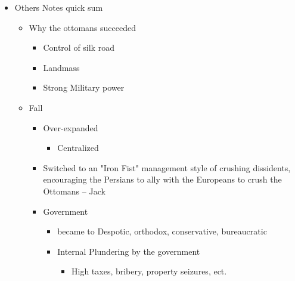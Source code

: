 \documentclass[letterpaper]{article}
\begin{document}
\begin{itemize}
\item Others Notes quick sum

\begin{itemize}
\item Why the ottomans succeeded

\begin{itemize}
\item Control of silk road
\item Landmass
\item Strong Military power
\end{itemize}

\item Fall

\begin{itemize}
\item Over-expanded

\begin{itemize}
\item Centralized
\end{itemize}

\item Switched to an "Iron Fist" management style of crushing
dissidents, encouraging the Persians to ally with the Europeans to
crush the Ottomans -- Jack
\item Government

\begin{itemize}
\item became to Despotic, orthodox, conservative, bureaucratic
\item Internal Plundering by the government

\begin{itemize}
\item High taxes, bribery, property seizures, ect.
\end{itemize}
\end{itemize}
\end{itemize}
\end{itemize}
\end{itemize}
\end{document}
